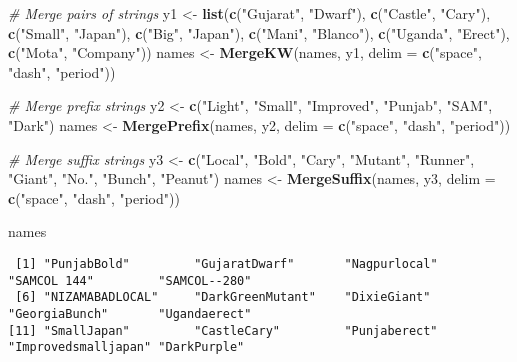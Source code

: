 \documentclass[
]{article}
\newenvironment{Shaded}{\begin{snugshade}}{\end{snugshade}}
\newcommand{\CommentTok}[1]{\textcolor[rgb]{0.56,0.35,0.01}{\textit{#1}}}
\newcommand{\DataTypeTok}[1]{\textcolor[rgb]{0.13,0.29,0.53}{#1}}
\newcommand{\KeywordTok}[1]{\textcolor[rgb]{0.13,0.29,0.53}{\textbf{#1}}}
\newcommand{\NormalTok}[1]{#1}
\newcommand{\StringTok}[1]{\textcolor[rgb]{0.31,0.60,0.02}{#1}}
\begin{document}
\begin{Shaded}
\begin{Highlighting}[]
\CommentTok{# Merge pairs of strings}
\NormalTok{y1 <-}\StringTok{ }\KeywordTok{list}\NormalTok{(}\KeywordTok{c}\NormalTok{(}\StringTok{"Gujarat"}\NormalTok{, }\StringTok{"Dwarf"}\NormalTok{), }\KeywordTok{c}\NormalTok{(}\StringTok{"Castle"}\NormalTok{, }\StringTok{"Cary"}\NormalTok{), }\KeywordTok{c}\NormalTok{(}\StringTok{"Small"}\NormalTok{, }\StringTok{"Japan"}\NormalTok{),}
           \KeywordTok{c}\NormalTok{(}\StringTok{"Big"}\NormalTok{, }\StringTok{"Japan"}\NormalTok{), }\KeywordTok{c}\NormalTok{(}\StringTok{"Mani"}\NormalTok{, }\StringTok{"Blanco"}\NormalTok{), }\KeywordTok{c}\NormalTok{(}\StringTok{"Uganda"}\NormalTok{, }\StringTok{"Erect"}\NormalTok{),}
           \KeywordTok{c}\NormalTok{(}\StringTok{"Mota"}\NormalTok{, }\StringTok{"Company"}\NormalTok{))}
\NormalTok{names <-}\StringTok{ }\KeywordTok{MergeKW}\NormalTok{(names, y1, }\DataTypeTok{delim =} \KeywordTok{c}\NormalTok{(}\StringTok{"space"}\NormalTok{, }\StringTok{"dash"}\NormalTok{, }\StringTok{"period"}\NormalTok{))}

\CommentTok{# Merge prefix strings}
\NormalTok{y2 <-}\StringTok{ }\KeywordTok{c}\NormalTok{(}\StringTok{"Light"}\NormalTok{, }\StringTok{"Small"}\NormalTok{, }\StringTok{"Improved"}\NormalTok{, }\StringTok{"Punjab"}\NormalTok{, }\StringTok{"SAM"}\NormalTok{, }\StringTok{"Dark"}\NormalTok{)}
\NormalTok{names <-}\StringTok{ }\KeywordTok{MergePrefix}\NormalTok{(names, y2, }\DataTypeTok{delim =} \KeywordTok{c}\NormalTok{(}\StringTok{"space"}\NormalTok{, }\StringTok{"dash"}\NormalTok{, }\StringTok{"period"}\NormalTok{))}

\CommentTok{# Merge suffix strings}
\NormalTok{y3 <-}\StringTok{ }\KeywordTok{c}\NormalTok{(}\StringTok{"Local"}\NormalTok{, }\StringTok{"Bold"}\NormalTok{, }\StringTok{"Cary"}\NormalTok{, }\StringTok{"Mutant"}\NormalTok{, }\StringTok{"Runner"}\NormalTok{, }\StringTok{"Giant"}\NormalTok{, }\StringTok{"No."}\NormalTok{,}
        \StringTok{"Bunch"}\NormalTok{, }\StringTok{"Peanut"}\NormalTok{)}
\NormalTok{names <-}\StringTok{ }\KeywordTok{MergeSuffix}\NormalTok{(names, y3, }\DataTypeTok{delim =} \KeywordTok{c}\NormalTok{(}\StringTok{"space"}\NormalTok{, }\StringTok{"dash"}\NormalTok{, }\StringTok{"period"}\NormalTok{))}

\NormalTok{names}
\end{Highlighting}
\end{Shaded}

\begin{verbatim}
 [1] "PunjabBold"         "GujaratDwarf"       "Nagpurlocal"        "SAMCOL 144"         "SAMCOL--280"       
 [6] "NIZAMABADLOCAL"     "DarkGreenMutant"    "DixieGiant"         "GeorgiaBunch"       "Ugandaerect"       
[11] "SmallJapan"         "CastleCary"         "Punjaberect"        "Improvedsmalljapan" "DarkPurple"        
\end{verbatim}
\end{document}
